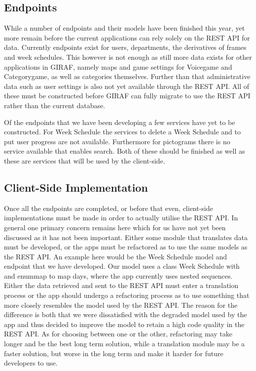 \subsection{Endpoints}
While a number of endpoints and their models have been finished this year, yet more remain before the current applications can rely solely on the REST API for data.
Currently endpoints exist for users, departments, the derivatives of frames and week schedules.
This however is not enough as still more data exists for other applications in GIRAF, namely maps and game settings for Voicegame and Categorygame, as well as categories themselves.
Further than that administrative data such as user settings is also not yet available through the REST API.
All of these must be constructed before GIRAF can fully migrate to use the REST API rather than the current database.

Of the endpoints that we have been developing a few services have yet to be constructed.
For Week Schedule the services to delete a Week Schedule and to put user progress are not available.
Furthermore for pictograms there is no service available that enables search.
Both of these should be finished as well as these are services that will be used by the client-side.
\subsection{Client-Side Implementation}
Once all the endpoints are completed, or before that even, client-side implementations must be made in order to actually utilise the REST API.
In general one primary concern remains here which for us have not yet been discussed as it has not been important.
Either some module that translates data must be developed, or the apps must be refactored as to use the same models as the REST API.
An example here would be the Week Schedule model and endpoint that we have developed.
Our model uses a class Week Schedule with and enummap to map days, where the app currently uses nested sequences.
Either the data retrieved and sent to the REST API must enter a translation process or the app should undergo a refactoring process as to use something that more closely resembles the model used by the REST API.
The reason for the difference is both that we were dissatisfied with the degraded model used by the app and thus decided to improve the model to retain a high code quality in the REST API.
As for choosing between one or the other, refactoring may take longer and be the best long term solution, while a translation module may be a faster solution, but worse in the long term and make it harder for future developers to use.

